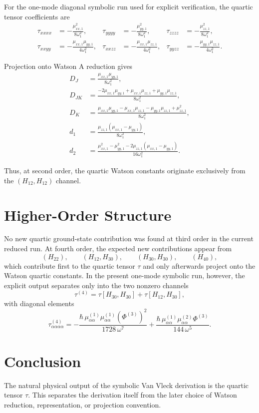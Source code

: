 \documentclass[11pt,a4paper]{article}
\begin{document}
For the one-mode diagonal symbolic run used for explicit verification, the quartic tensor
coefficients are
\begin{align}
\tau_{xxxx} &= -\frac{\mu_{xx,1}^2}{8\omega_1^2}, &
\tau_{yyyy} &= -\frac{\mu_{yy,1}^2}{8\omega_1^2}, &
\tau_{zzzz} &= -\frac{\mu_{zz,1}^2}{8\omega_1^2},\\
\tau_{xxyy} &= -\frac{\mu_{xx,1}\mu_{yy,1}}{4\omega_1^2}, &
\tau_{xxzz} &= -\frac{\mu_{xx,1}\mu_{zz,1}}{4\omega_1^2}, &
\tau_{yyzz} &= -\frac{\mu_{yy,1}\mu_{zz,1}}{4\omega_1^2}.
\end{align}

Projection onto Watson A reduction gives
\begin{align}
D_J &= \frac{\mu_{xx,1}\mu_{yy,1}}{8\omega_1^2},\\
D_{JK} &= \frac{-2\mu_{xx,1}\mu_{yy,1} + \mu_{xx,1}\mu_{zz,1} + \mu_{yy,1}\mu_{zz,1}}{8\omega_1^2},\\
D_K &= \frac{\mu_{xx,1}\mu_{yy,1} - \mu_{xx,1}\mu_{zz,1} - \mu_{yy,1}\mu_{zz,1} + \mu_{zz,1}^2}{8\omega_1^2},\\
d_1 &= \frac{\mu_{zz,1}(\mu_{xx,1}-\mu_{yy,1})}{8\omega_1^2},\\
d_2 &= \frac{\mu_{xx,1}^2 - \mu_{yy,1}^2 - 2\mu_{zz,1}(\mu_{xx,1}-\mu_{yy,1})}{16\omega_1^2}.
\end{align}

Thus, at second order, the quartic Watson constants originate exclusively from the
\((H_{12},H_{12})\) channel.

\section*{Higher-Order Structure}
No new quartic ground-state contribution was found at third order in the current reduced run.
At fourth order, the expected new contributions appear from
\begin{equation}
(H_{22}),\qquad (H_{12},H_{30}),\qquad (H_{30},H_{30}),\qquad (H_{40}),
\end{equation}
which contribute first to the quartic tensor \(\tau\) and only afterwards project onto the
Watson quartic constants. In the present one-mode symbolic run, however, the explicit output
separates only into the two nonzero channels
\[
\tau^{(4)}=\tau[H_{30},H_{30}] + \tau[H_{12},H_{30}],
\]
with diagonal elements
\[
\tau_{\alpha\alpha\alpha\alpha}^{(4)}
=
-\frac{\hbar\,\mu_{\alpha\alpha}^{(1)}\mu_{\alpha\alpha}^{(1)}\left(\Phi^{(3)}\right)^2}{1728\,\omega^7}
+\frac{\hbar\,\mu_{\alpha\alpha}^{(1)}\mu_{\alpha\alpha}^{(2)}\Phi^{(3)}}{144\,\omega^5}.
\]

\section*{Conclusion}
The natural physical output of the symbolic Van Vleck derivation is the quartic tensor
\(\tau\). This separates the derivation itself from the later choice of Watson reduction,
representation, or projection convention.
\end{document}
